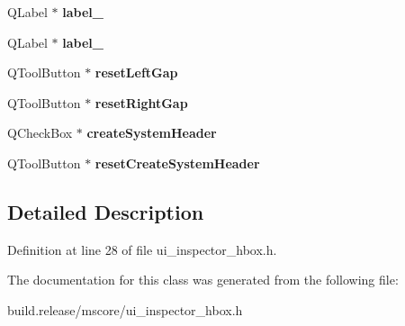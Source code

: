 \begin{DoxyCompactItemize}
Q\+Label $\ast$ {\bfseries label\+\_}
\item 
\mbox{\label{class_ui___inspector_h_box_a8cf3d2620c162d7bd19764e13cb30436}} 
Q\+Label $\ast$ {\bfseries label\+\_}
\item 
\mbox{\label{class_ui___inspector_h_box_a2d48233f9fa0e80daecaba179cc59f19}} 
Q\+Tool\+Button $\ast$ {\bfseries reset\+Left\+Gap}
\item 
\mbox{\label{class_ui___inspector_h_box_ac9627ae3b7f475e247e9d6f8ff879894}} 
Q\+Tool\+Button $\ast$ {\bfseries reset\+Right\+Gap}
\item 
\mbox{\label{class_ui___inspector_h_box_ace8aa6a4b146a46838fb0d2bb0bb9f1c}} 
Q\+Check\+Box $\ast$ {\bfseries create\+System\+Header}
\item 
\mbox{\label{class_ui___inspector_h_box_acba44e475affed47b07457b699ddb106}} 
Q\+Tool\+Button $\ast$ {\bfseries reset\+Create\+System\+Header}
\end{DoxyCompactItemize}


\subsection{Detailed Description}


Definition at line 28 of file ui\+\_\+inspector\+\_\+hbox.\+h.



The documentation for this class was generated from the following file\+:\begin{DoxyCompactItemize}
\item 
build.\+release/mscore/ui\+\_\+inspector\+\_\+hbox.\+h\end{DoxyCompactItemize}
